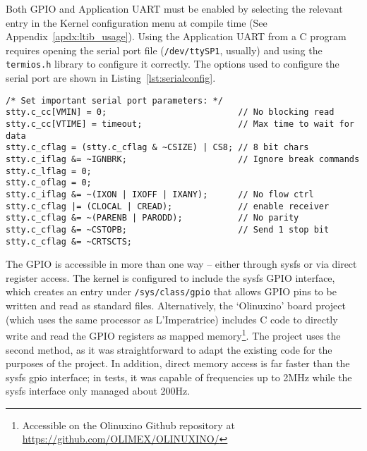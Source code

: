 		Both GPIO and Application UART must be enabled by selecting the relevant entry in the Kernel configuration menu at compile time (See Appendix~\ref{apdx:ltib_usage}).  Using the Application UART from a C program requires opening the serial port file (\texttt{/dev/ttySP1}, usually) and using the \texttt{termios.h} library to configure it correctly.  The options used to configure the serial port are shown in Listing~\ref{lst:serialconfig}.

\begin{lstlisting}[style=customc, label=lst:serialconfig, caption=Serial Port Configuration]
/* Set important serial port parameters: */
stty.c_cc[VMIN] = 0;                          // No blocking read
stty.c_cc[VTIME] = timeout;                   // Max time to wait for data
stty.c_cflag = (stty.c_cflag & ~CSIZE) | CS8; // 8 bit chars
stty.c_iflag &= ~IGNBRK;                      // Ignore break commands
stty.c_lflag = 0;
stty.c_oflag = 0;
stty.c_iflag &= ~(IXON | IXOFF | IXANY);      // No flow ctrl
stty.c_cflag |= (CLOCAL | CREAD);             // enable receiver
stty.c_cflag &= ~(PARENB | PARODD);           // No parity
stty.c_cflag &= ~CSTOPB;                      // Send 1 stop bit
stty.c_cflag &= ~CRTSCTS;
\end{lstlisting}

		The GPIO is accessible in more than one way -- either through sysfs or via direct register access.  The kernel is configured to include the sysfs GPIO interface, which creates an entry under \texttt{/sys/class/gpio} that allows GPIO pins to be written and read as standard files.  Alternatively, the `Olinuxino' board project (which uses the same processor as L'Imperatrice) includes C code to directly write and read the GPIO registers as mapped memory\footnote{Accessible on the Olinuxino Github repository at \href{https://github.com/OLIMEX/OLINUXINO/}{https://github.com/OLIMEX/OLINUXINO/}}.  The project uses the second method, as it was straightforward to adapt the existing code for the purposes of the project.  In addition, direct memory access is far faster than the sysfs gpio interface; in tests, it was capable of frequencies up to 2MHz while the sysfs interface only managed about 200Hz.



